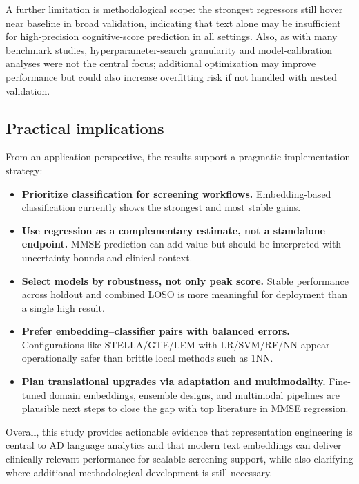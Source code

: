 \documentclass[final,5p,times]{elsarticle}
\begin{document}
A further limitation is methodological scope: the strongest regressors still hover near baseline in broad validation, indicating that text alone may be insufficient for high-precision cognitive-score prediction in all settings. Also, as with many benchmark studies, hyperparameter-search granularity and model-calibration analyses were not the central focus; additional optimization may improve performance but could also increase overfitting risk if not handled with nested validation.

\subsection{Practical implications}
\label{subsec:practical_implications}

From an application perspective, the results support a pragmatic implementation strategy:

\begin{itemize}
    \item \textbf{Prioritize classification for screening workflows.}  
    Embedding-based classification currently shows the strongest and most stable gains.

    \item \textbf{Use regression as a complementary estimate, not a standalone endpoint.}  
    MMSE prediction can add value but should be interpreted with uncertainty bounds and clinical context.

    \item \textbf{Select models by robustness, not only peak score.}  
    Stable performance across holdout and combined LOSO is more meaningful for deployment than a single high result.

    \item \textbf{Prefer embedding--classifier pairs with balanced errors.}  
    Configurations like STELLA/GTE/LEM with LR/SVM/RF/NN appear operationally safer than brittle local methods such as 1NN.

    \item \textbf{Plan translational upgrades via adaptation and multimodality.}  
    Fine-tuned domain embeddings, ensemble designs, and multimodal pipelines are plausible next steps to close the gap with top literature in MMSE regression.
\end{itemize}

Overall, this study provides actionable evidence that representation engineering is central to AD language analytics and that modern text embeddings can deliver clinically relevant performance for scalable screening support, while also clarifying where additional methodological development is still necessary.
\end{document}
